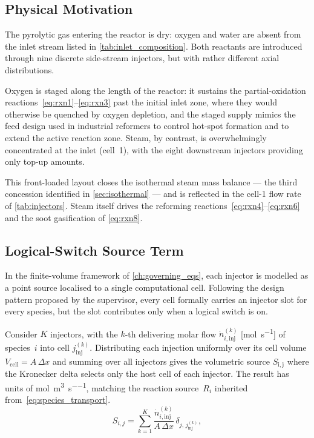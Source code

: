 \subsection{Physical Motivation}\label{ssec:injector_motivation}

The pyrolytic gas entering the reactor is dry: oxygen and water are absent from the inlet stream listed in \cref{tab:inlet_composition}. Both reactants are introduced through nine discrete side-stream injectors, but with rather different axial distributions. 

Oxygen is staged along the length of the reactor: it sustains the partial-oxidation reactions~\eqref{eq:rxn1}--\eqref{eq:rxn3} past the initial inlet zone, where they would otherwise be quenched by oxygen depletion, and the staged supply mimics the feed design used in industrial reformers to control hot-spot formation and to extend the active reaction zone. Steam, by contrast, is overwhelmingly concentrated at the inlet (cell~1), with the eight downstream injectors providing only top-up amounts. 

This front-loaded layout closes the isothermal steam mass balance --- the third concession identified in \cref{sec:isothermal} --- and is reflected in the cell-1  flow rate of \cref{tab:injectors}. Steam itself drives the reforming reactions~\eqref{eq:rxn4}--\eqref{eq:rxn6} and the soot gasification of \cref{eq:rxn8}.

\subsection{Logical-Switch Source Term}\label{ssec:logical_switch}

In the finite-volume framework of \cref{ch:governing_eqs}, each injector is modelled as a point source localised to a single computational cell. Following the design pattern proposed by the supervisor, every cell formally carries an injector slot for every species, but the slot contributes only when a logical switch is on. 

Consider \(K\) injectors, with the \(k\)-th delivering molar flow \(\dot{n}_{i,\mathrm{inj}}^{(k)}\) [\si{\mole\per\second}] of species~\(i\) into cell \(j_{\mathrm{inj}}^{(k)}\). Distributing each injection uniformly over its cell volume \(V_{\mathrm{cell}} = A\,\Delta x\) and summing over all injectors gives the volumetric source \(S_{\mathrm{i,j}}\) where the Kronecker delta selects only the host cell of each injector. The result has units of \si{\mole\per\metre\cubed\per\second}, matching the reaction source~\(R_i\) inherited from~\eqref{eq:species_transport}.
%
\begin{equation}
  S_{i,j}
  = \sum_{k=1}^{K} \frac{\dot{n}_{i,\mathrm{inj}}^{(k)}}{A\,\Delta x}\,
    \delta_{j,\,j_{\mathrm{inj}}^{(k)}},
  \label{eq:injection_total}
\end{equation}
%


